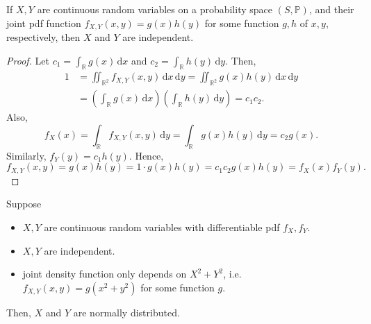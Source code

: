 \begin{proposition}
    If \(X, Y\) are continuous random variables on a probability space \((S, \mathbb{P})\), and their joint pdf function \(f_{X, Y}(x, y) = g(x) h(y)\) for some function \(g, h\) of \(x, y\), respectively, then \(X\) and \(Y\) are independent.     
\end{proposition}

\begin{proof}
    Let \(c_1 = \int _\mathbb{R} g(x) \, \mathrm{d} x\) and \(c_2 = \int _\mathbb{R} h(y) \, \mathrm{d} y\). Then, 
    \begin{align*}
        1 &= \iint_{\mathbb{R} ^2} f_{X, Y}(x, y) \, \mathrm{d} x \, \mathrm{d} y = \iint_{\mathbb{R} ^2} g(x) h(y) \, \mathrm{d} x \, \mathrm{d} y \\
        &= \left( \int _\mathbb{R} g(x) \, \mathrm{d} x  \right) \left( \int _\mathbb{R} h(y) \, \mathrm{d} y \right) = c_1 c_2.     
    \end{align*}  
    Also,
    \[
        f_X(x) = \int _{\mathbb{R} } f_{X, Y}(x, y) \, \mathrm{d} y = \int _{\mathbb{R}} g(x) h(y) \, \mathrm{d} y = c_2 g(x).  
    \]
    Similarly, \(f_Y(y) = c_1 h(y)\). Hence,
    \[
        f_{X, Y}(x, y) = g(x) h(y) = 1 \cdot g(x) h(y) = c_1 c_2 g(x) h(y) = f_X(x) f_Y(y).
    \] 
\end{proof}

\begin{eg}
    Suppose
    \begin{itemize}
        \item \(X, Y\) are continuous random variables with differentiable pdf \(f_X, f_Y\). 
        \item \(X, Y\) are independent. 
        \item joint density function only depends on \(X^2 + Y^2\), i.e. \(f_{X, Y}(x, y) = g(x^2 + y^2)\) for some function \(g\).      
    \end{itemize}
    Then, \(X\) and \(Y\) are normally distributed.  
\end{eg}

